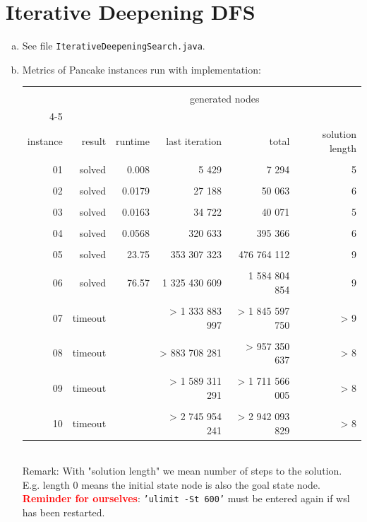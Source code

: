 \documentclass{article} %
\begin{document}
\section{Iterative Deepening DFS}
\begin{enumerate}[(a)]
    \item See file \texttt{IterativeDeepeningSearch.java}.
    
    \item Metrics of Pancake instances run with implementation:\\
    \begin{table}[h!]
    \begin{tabular}{rrrrrr}
    \hline
    \\[-0.8em]
     & & & \multicolumn{2}{c}{generated nodes} & \\[0.2em] \cline{4-5} \\[-0.8em]
    instance & result & runtime & last iteration & total & solution length  \\[0.2em] \hline
    \\[-0.8em]
    01 & solved & 0.008 & 5 429 & 7 294 & 5 \\[0.2em] \hline
    \\[-0.8em]
    02 & solved & 0.0179 & 27 188 & 50 063 & 6 \\[0.2em] \hline
    \\[-0.8em]
    03 & solved & 0.0163 & 34 722 & 40 071 & 5 \\[0.2em] \hline
    \\[-0.8em]
    04 & solved & 0.0568 & 320 633 & 395 366 & 6 \\[0.2em] \hline
    \\[-0.8em]
    05 & solved & 23.75 & 353 307 323 & 476 764 112 & 9 \\[0.2em] \hline
    \\[-0.8em]
    06 & solved & 76.57 & 1 325 430 609 & 1 584 804 854 & 9 \\[0.2em] \hline
    \\[-0.8em]
    07 & timeout & & > 1 333 883 997 & > 1 845 597 750 & > 9 \\[0.2em] \hline
    \\[-0.8em]
    08 & timeout & & > 883 708 281 & > 957 350 637 & > 8 \\[0.2em] \hline
    \\[-0.8em]
    09 & timeout & & > 1 589 311 291 & > 1 711 566 005 & > 8 \\[0.2em] \hline
    \\[-0.8em]
    10 & timeout & & > 2 745 954 241 & > 2 942 093 829 & > 8 \\[0.2em] \hline
    \end{tabular}
    \end{table}\\[-0.5em]
    Remark: With "solution length" we mean number of steps to the solution. E.g. length 0 means the
    initial state node is also the goal state node. \\[0.5em]
    \textcolor{red}{\textbf{Reminder for ourselves}}: \texttt{'ulimit -St 600'} must be
    entered again if wsl has been restarted.


\end{enumerate}
\end{document}
